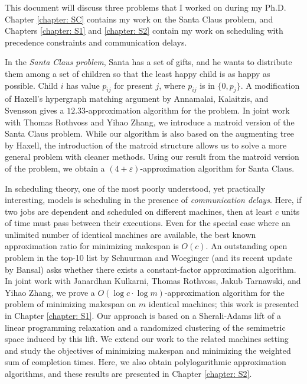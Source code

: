 This document will discuss three problems that I worked on during my Ph.D. 
Chapter \ref{chapter: SC} contains my work on the Santa Claus problem, and
Chapters \ref{chapter: S1} and \ref{chapter: S2} contain my work on scheduling with precedence constraints and communication delays.

In the \emph{Santa Claus problem}, Santa has a set of gifts, and he wants to distribute them among a set of children
so that the least happy child is as happy as possible. 
Child $i$ has value $p_{ij}$ for present $j$, where $p_{ij}$ is in $ \{ 0,p_j\}$.
A modification of Haxell's hypergraph matching argument by Annamalai, Kalaitzis, and Svensson gives a $12.33$-approximation algorithm for the problem.
In joint work with Thomas Rothvoss and Yihao Zhang, we introduce a matroid version of the Santa Claus problem. 
While our algorithm is also based on the augmenting tree by Haxell, the introduction
of the matroid structure allows us to solve a more general problem with cleaner methods.
Using our result from the matroid version of the problem, we obtain a $(4+\varepsilon)$-approximation algorithm for Santa Claus.

In scheduling theory, one of the most poorly understood, yet practically interesting, models is scheduling
in the presence of \emph{communication delays}.
Here,
if two jobs are dependent and scheduled on different machines,
then at least $c$ units of time must pass between their executions.
Even for the special case where an unlimited number of identical machines are available, the best known approximation ratio
for minimizing makespan is $O(c)$.
An outstanding open problem in the top-10 list by Schuurman and Woeginger (and its recent update by Bansal)
asks whether there exists a constant-factor approximation algorithm.
In joint work with Janardhan Kulkarni, Thomas Rothvoss, Jakub Tarnawski, and Yihao Zhang,
 we prove a $O(\log c \cdot \log m)$-approximation algorithm
for the problem of minimizing makespan
on $m$ identical machines; this work is presented in Chapter \ref{chapter: S1}.
Our approach is based on a Sherali-Adams lift of a linear programming relaxation
and a randomized clustering of the semimetric space induced by this lift. 
We extend our work to the related machines setting and study the objectives of minimizing makespan 
and minimizing the weighted sum of completion times. 
Here, we also obtain polylogarithmic approximation algorithms, and these results are presented in Chapter \ref{chapter: S2}.